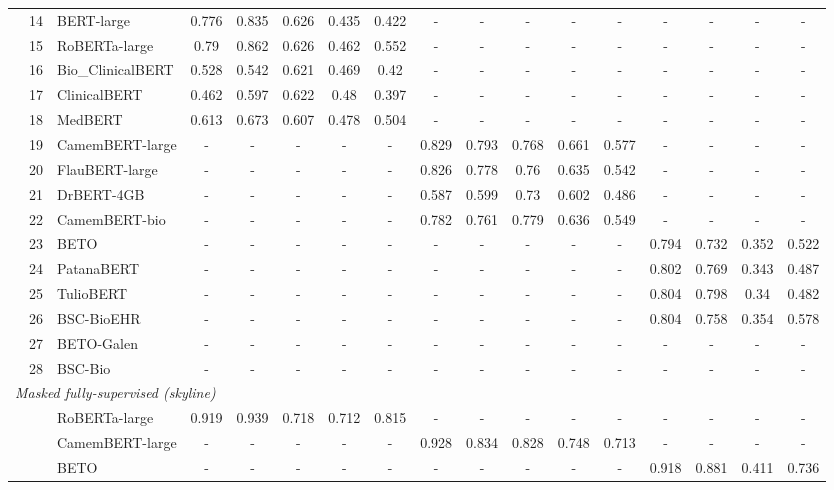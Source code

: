 {\begin{tabular}{lll|ccccc|ccccc|cccc}
 & 14 & BERT-large & 0.776 & 0.835 & 0.626 & 0.435 & 0.422 & - & - & - & - & - & - & - & - & - \\
 & 15 & RoBERTa-large & 0.79 & 0.862 & 0.626 & 0.462 & 0.552 & - & - & - & - & - & - & - & - & - \\
 & 16 & Bio\_ClinicalBERT & 0.528 & 0.542 & 0.621 & 0.469 & 0.42 & - & - & - & - & - & - & - & - & - \\
 & 17 & ClinicalBERT & 0.462 & 0.597 & 0.622 & 0.48 & 0.397 & - & - & - & - & - & - & - & - & - \\
 & 18 & MedBERT & 0.613 & 0.673 & 0.607 & 0.478 & 0.504 & - & - & - & - & - & - & - & - & - \\
 & 19 & CamemBERT-large & - & - & - & - & - & 0.829 & 0.793 & 0.768 & 0.661 & 0.577 & - & - & - & - \\
 & 20 & FlauBERT-large & - & - & - & - & - & 0.826 & 0.778 & 0.76 & 0.635 & 0.542 & - & - & - & - \\
 & 21 & DrBERT-4GB & - & - & - & - & - & 0.587 & 0.599 & 0.73 & 0.602 & 0.486 & - & - & - & - \\
 & 22 & CamemBERT-bio & - & - & - & - & - & 0.782 & 0.761 & 0.779 & 0.636 & 0.549 & - & - & - & - \\
 & 23 & BETO & - & - & - & - & - & - & - & - & - & - & 0.794 & 0.732 & 0.352 & 0.522 \\
 & 24 & PatanaBERT & - & - & - & - & - & - & - & - & - & - & 0.802 & 0.769 & 0.343 & 0.487 \\
 & 25 & TulioBERT & - & - & - & - & - & - & - & - & - & - & 0.804 & 0.798 & 0.34 & 0.482 \\
 & 26 & BSC-BioEHR & - & - & - & - & - & - & - & - & - & - & 0.804 & 0.758 & 0.354 & 0.578 \\
 & 27 & BETO-Galen & - & - & - & - & - & - & - & - & - & - & - & - & - & - \\
 & 28 & BSC-Bio & - & - & - & - & - & - & - & - & - & - & - & - & - & - \\
\midrule
\midrule
\multicolumn{17}{l}{\textit{Masked fully-supervised (skyline)}} \\
\midrule
 & & RoBERTa-large & 0.919 & 0.939 & 0.718 & 0.712 & 0.815 & - & - & - & - & - & - & - & - & - \\
 & & CamemBERT-large & - & - & - & - & - & 0.928 & 0.834 & 0.828 & 0.748 & 0.713 & - & - & - & - \\
 & & BETO & - & - & - & - & - & - & - & - & - & - & 0.918 & 0.881 & 0.411 & 0.736 \\
\bottomrule
\end{tabular}}